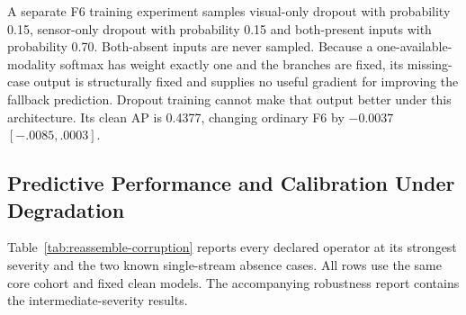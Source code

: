 A separate F6 training experiment samples visual-only dropout with probability 0.15,
sensor-only dropout with probability 0.15 and both-present inputs with probability 0.70.
Both-absent inputs are never sampled. Because a one-available-modality softmax has
weight exactly one and the branches are fixed, its missing-case output is structurally
fixed and supplies no useful gradient for improving the fallback prediction. Dropout
training cannot make that output better under this architecture. Its clean AP is 0.4377,
changing ordinary F6 by $-0.0037$ $[-.0085,.0003]$.

\subsection{Predictive Performance and Calibration Under Degradation}

Table~\ref{tab:reassemble-corruption} reports every declared operator at its strongest
severity and the two known single-stream absence cases. All rows use the same core
cohort and fixed clean models. The accompanying robustness report contains the
intermediate-severity results.

